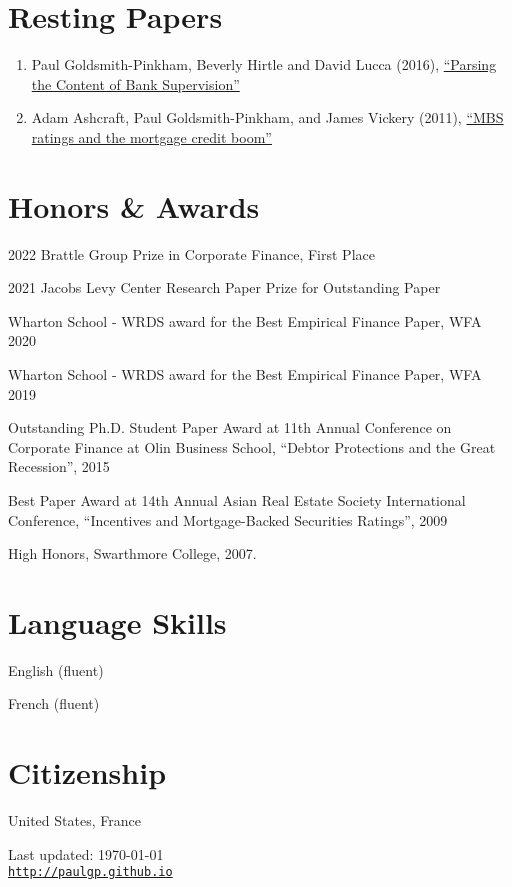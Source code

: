 \documentclass[letterpaper]{article}
\renewenvironment{itemize}{
  \begin{list}{}
    { \setlength{\itemsep}{5pt}
      \setlength{\parsep}{0pt}
      \setlength{\topsep}{0pt}
      \setlength{\leftmargin}{0em} } }{
  \end{list}}
\begin{document}
\section*{Resting Papers}
\begin{enumerate}
\item Paul Goldsmith-Pinkham, Beverly Hirtle and David Lucca (2016), \href{https://www.newyorkfed.org/research/staff_reports/sr770.html}{``Parsing the Content of Bank Supervision''}
\item Adam Ashcraft, Paul Goldsmith-Pinkham, and James Vickery (2011), \href{http://papers.ssrn.com/sol3/papers.cfm?abstract_id=1615613}{``MBS ratings and the mortgage credit boom''}
\end{enumerate}

\section*{Honors \& Awards}
\begin{itemize}
\item 2022 Brattle Group Prize in Corporate Finance, First Place
\item 2021 Jacobs Levy Center Research Paper Prize for Outstanding Paper
\item Wharton School - WRDS award for the Best Empirical Finance Paper, WFA 2020
\item Wharton School - WRDS award for the Best Empirical Finance Paper, WFA 2019
\item Outstanding Ph.D. Student Paper Award at 11th Annual Conference
  on Corporate Finance at Olin Business School, ``Debtor Protections
  and the Great Recession'', 2015
\item Best Paper Award at 14th Annual Asian Real Estate Society
  International Conference, ``Incentives and Mortgage-Backed
  Securities Ratings'', 2009
\item High Honors, Swarthmore College, 2007.
\end{itemize}

\section*{Language Skills}
\begin{itemize}
\item English (fluent)
\item French (fluent)
\end{itemize}
\bigskip

\section*{Citizenship}
United States, France
\begin{center}
\begin{footnotesize}
Last updated: \today \\
\href{http://paulgp.github.io}{\tt http://paulgp.github.io}
\end{footnotesize}
\end{center}
\end{document}
